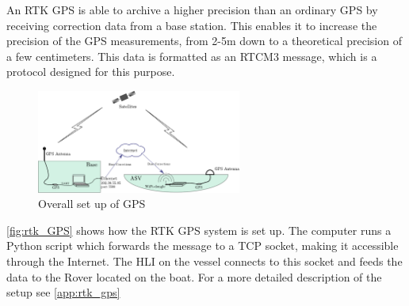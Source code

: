 An RTK GPS is able to archive a higher precision than an ordinary GPS by receiving correction data from a base station.
This enables it to increase the precision of the GPS measurements, from 2-5m down to a theoretical precision of a few centimeters.
This data is formatted as an RTCM3 message, which is a protocol designed for this purpose.
\begin{figure}[H]
	\includegraphics[width=0.6\textwidth]{figures/comunicationSetup.pdf}
	\caption{Overall set up of GPS}
	\label{fig:rtk_GPS}
\end{figure}
\autoref{fig:rtk_GPS} shows how the RTK GPS system is set up. 
The computer runs a Python script which forwards the message to a TCP socket, making it accessible through the Internet. 
The HLI on the vessel connects to this socket and feeds the data to the Rover located on the boat.
For a more detailed description of the setup see \autoref{app:rtk_gps}
